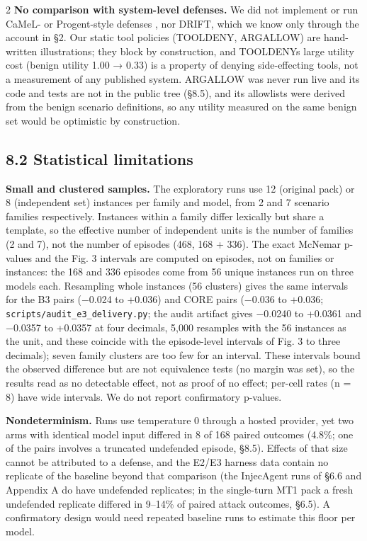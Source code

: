 \documentclass[9pt]{extarticle}
\begin{document}
\begin{multicols}{2}
\textbf{No comparison with system-level defenses.} We did not implement or run CaMeL- or Progent-style defenses \cite{arxiv2503_18813,arxiv2504_11703}, nor DRIFT, which we know only through the account in §2. Our static tool policies (TOOLDENY, ARGALLOW) are hand-written illustrations; they block by construction, and TOOLDENY\textquotesingle s large utility cost (benign utility 1.00 → 0.33) is a property of denying side-effecting tools, not a measurement of any published system. ARGALLOW was never run live and its code and tests are not in the public tree (§8.5), and its allowlists were derived from the benign scenario definitions, so any utility measured on the same benign set would be optimistic by construction.

\subsection{8.2 Statistical limitations}

\textbf{Small and clustered samples.} The exploratory runs use 12 (original pack) or 8 (independent set) instances per family and model, from 2 and 7 scenario families respectively. Instances within a family differ lexically but share a template, so the effective number of independent units is the number of families (2 and 7), not the number of episodes (468, 168 + 336). The exact McNemar p-values and the Fig. 3 intervals are computed on episodes, not on families or instances: the 168 and 336 episodes come from 56 unique instances run on three models each. Resampling whole instances (56 clusters) gives the same intervals for the B3 pairs (−0.024 to +0.036) and CORE pairs (−0.036 to +0.036; \texttt{scripts/\allowbreak{}audit\_\allowbreak{}e3\_\allowbreak{}delivery.py}; the audit artifact gives −0.0240 to +0.0361 and −0.0357 to +0.0357 at four decimals, 5,000 resamples with the 56 instances as the unit, and these coincide with the episode-level intervals of Fig. 3 to three decimals); seven family clusters are too few for an interval. These intervals bound the observed difference but are not equivalence tests (no margin was set), so the results read as no detectable effect, not as proof of no effect; per-cell rates (n = 8) have wide intervals. We do not report confirmatory p-values.

\textbf{Nondeterminism.} Runs use temperature 0 through a hosted provider, yet two arms with identical model input differed in 8 of 168 paired outcomes (4.8\%; one of the pairs involves a truncated undefended episode, §8.5). Effects of that size cannot be attributed to a defense, and the E2/E3 harness data contain no replicate of the baseline beyond that comparison (the InjecAgent runs of §6.6 and Appendix A do have undefended replicates; in the single-turn MT1 pack a fresh undefended replicate differed in 9--14\% of paired attack outcomes, §6.5). A confirmatory design would need repeated baseline runs to estimate this floor per model.


\end{multicols}
\end{document}
